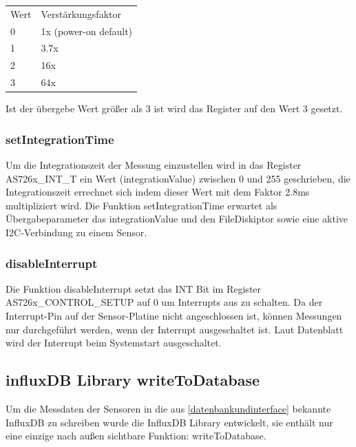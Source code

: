 \begin{tabular}{ l l}
 	Wert & Verstärkungsfaktor \\ 
 	0 & 1x (power-on default) \\  
 	1 & 3.7x \\
 	2 & 16x \\  
 	3 & 64x \\
\end{tabular}

Ist der übergebe Wert größer als 3 ist wird das Register auf den Wert 3 gesetzt.

\subsubsection{setIntegrationTime}
Um die Integrationszeit der Messung einzustellen wird in das Register AS726x\_INT\_T ein Wert (integrationValue) zwischen 0 und 255 geschrieben, die Integrationszeit errechnet sich indem dieser Wert mit dem Faktor 2.8ms multipliziert wird.
Die Funktion setIntegrationTime erwartet als Übergabeparameter das integrationValue und den FileDiskiptor sowie eine aktive I2C-Verbindung zu einem Sensor.\\

\subsubsection{disableInterrupt}
Die Funktion disableInterrupt setzt das INT Bit im Register AS726x\_CONTROL\_SETUP auf 0 um Interrupts aus zu schalten.
Da der Interrupt-Pin auf der Sensor-Platine nicht angeschlossen ist, können Messungen nur durchgeführt werden, wenn der Interrupt ausgeschaltet ist.
Laut Datenblatt wird der Interrupt beim Systemstart ausgeschaltet.

\subsection{influxDB Library writeToDatabase}
Um die Messdaten der Sensoren in die aus \ref{datenbankundinterface} bekannte InfluxDB zu schreiben wurde die InfluxDB Library entwickelt, sie enthält nur eine einzige nach außen sichtbare Funktion: writeToDatabase.

